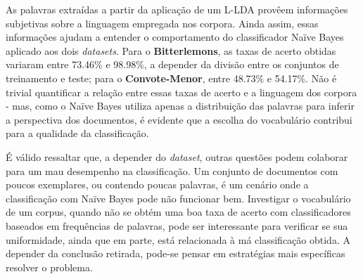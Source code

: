 

As palavras extraídas a partir da aplicação de um L-LDA provêem informações subjetivas sobre a linguagem empregada nos corpora. Ainda assim, essas informações ajudam a entender o comportamento do classificador Naïve Bayes aplicado aos dois \emph{datasets}. Para o \textbf{Bitterlemons}, as taxas de acerto obtidas variaram entre 73.46\% e 98.98\%, a depender da divisão entre os conjuntos de treinamento e teste; para o \textbf{Convote-Menor}, entre 48.73\% e 54.17\%. Não é trivial quantificar a relação entre essas taxas de acerto e a linguagem dos corpora - mas, como o Naïve Bayes utiliza apenas a distribuição das palavras para inferir a perspectiva dos documentos, é evidente que a escolha do vocabulário contribui para a qualidade da classificação.




É válido ressaltar que, a depender do \emph{dataset}, outras questões podem colaborar para um mau desempenho na classificação. Um conjunto de documentos com poucos exemplares, ou contendo poucas palavras, é um cenário onde a classificação com Naïve Bayes pode não funcionar bem. Investigar o vocabulário de um corpus, quando não se obtém uma boa taxa de acerto com classificadores baseados em frequências de palavras, pode ser interessante para verificar se sua uniformidade, ainda que em parte, está relacionada à má classificação obtida. A depender da conclusão retirada, pode-se pensar em estratégias mais específicas resolver o problema. 
 




